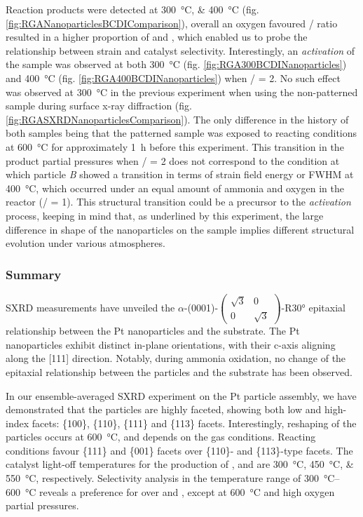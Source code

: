 Reaction products were detected at \qtylist{300;400}{\degreeCelsius} (fig. \ref{fig:RGANanoparticlesBCDIComparison}), overall an oxygen favoured / ratio resulted in a higher proportion of  and , which enabled us to probe the relationship between strain and catalyst selectivity.
Interestingly, an \textit{activation} of the sample was observed at both \qty{300}{\degreeCelsius} (fig. \ref{fig:RGA300BCDINanoparticles}) and \qty{400}{\degreeCelsius} (fig. \ref{fig:RGA400BCDINanoparticles}) when / = 2.
No such effect was observed at \qty{300}{\degreeCelsius} in the previous experiment when using the non-patterned sample during surface x-ray diffraction (fig. \ref{fig:RGASXRDNanoparticlesComparison}).
The only difference in the history of both samples being that the patterned sample was exposed to reacting conditions at \qty{600}{\degreeCelsius} for approximately \qty{1}{\hour} before this experiment.
This transition in the product partial pressures when / = 2 does not correspond to the condition at which particle \textit{B} showed a transition in terms of strain field energy or FWHM at \qty{400}{\degreeCelsius}, which occurred under an equal amount of ammonia and oxygen in the reactor (/ = 1).
This structural transition could be a precursor to the \textit{activation} process, keeping in mind that, as underlined by this experiment, the large difference in shape of the nanoparticles on the sample implies different structural evolution under various atmospheres.

\subsubsection{Summary}

SXRD measurements have unveiled the $\alpha$-(0001)-$\begin{pmatrix} \sqrt{3} & 0\\ 0 & \sqrt{3} \end{pmatrix}$-R\ang{30} epitaxial relationship between the Pt nanoparticles and the substrate.
The Pt nanoparticles exhibit distinct in-plane orientations, with their c-axis aligning along the [111] direction.
Notably, during ammonia oxidation, no change of the epitaxial relationship between the particles and the substrate has been observed.

In our ensemble-averaged SXRD experiment on the Pt particle assembly, we have demonstrated that the particles are highly faceted, showing both low and high-index facets: \{100\}, \{110\}, \{111\} and \{113\} facets.
Interestingly, reshaping of the particles occurs at \qty{600}{\degreeCelsius}, and depends on the gas conditions.
Reacting conditions favour \{111\} and \{001\} facets over \{110\}- and \{113\}-type facets.
The catalyst light-off temperatures for the production of ,  and  are \qtylist{300;450;550}{\degreeCelsius}, respectively.
Selectivity analysis in the temperature range of \qtyrange{300}{600}{\degreeCelsius} reveals a preference for  over  and , except at \qty{600}{\degreeCelsius} and high oxygen partial pressures.


